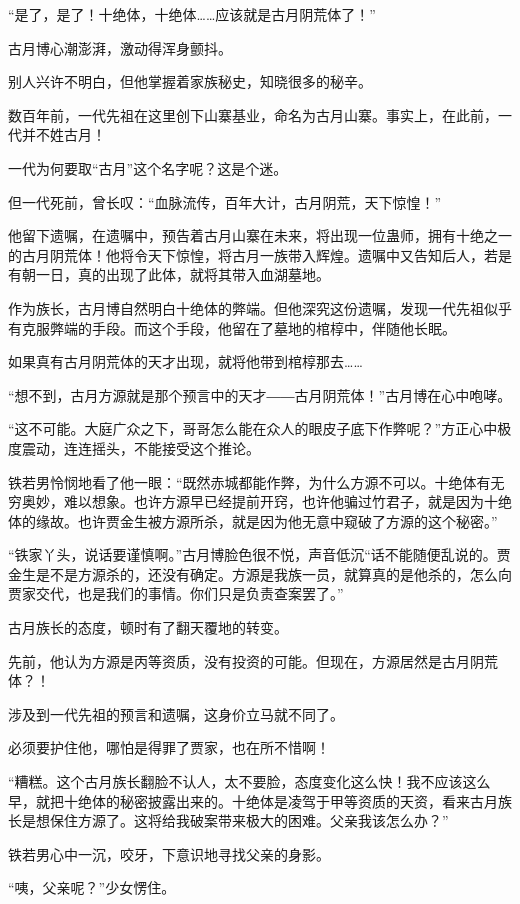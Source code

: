 \begin{this_body}
“是了，是了！十绝体，十绝体……应该就是古月阴荒体了！”

古月博心潮澎湃，激动得浑身颤抖。

别人兴许不明白，但他掌握着家族秘史，知晓很多的秘辛。

数百年前，一代先祖在这里创下山寨基业，命名为古月山寨。事实上，在此前，一代并不姓古月！

一代为何要取“古月”这个名字呢？这是个迷。

但一代死前，曾长叹：“血脉流传，百年大计，古月阴荒，天下惊惶！”

他留下遗嘱，在遗嘱中，预告着古月山寨在未来，将出现一位蛊师，拥有十绝之一的古月阴荒体！他将令天下惊惶，将古月一族带入辉煌。遗嘱中又告知后人，若是有朝一日，真的出现了此体，就将其带入血湖墓地。

作为族长，古月博自然明白十绝体的弊端。但他深究这份遗嘱，发现一代先祖似乎有克服弊端的手段。而这个手段，他留在了墓地的棺椁中，伴随他长眠。

如果真有古月阴荒体的天才出现，就将他带到棺椁那去……

“想不到，古月方源就是那个预言中的天才――古月阴荒体！”古月博在心中咆哮。

“这不可能。大庭广众之下，哥哥怎么能在众人的眼皮子底下作弊呢？”方正心中极度震动，连连摇头，不能接受这个推论。

铁若男怜悯地看了他一眼：“既然赤城都能作弊，为什么方源不可以。十绝体有无穷奥妙，难以想象。也许方源早已经提前开窍，也许他骗过竹君子，就是因为十绝体的缘故。也许贾金生被方源所杀，就是因为他无意中窥破了方源的这个秘密。”

“铁家丫头，说话要谨慎啊。”古月博脸色很不悦，声音低沉“话不能随便乱说的。贾金生是不是方源杀的，还没有确定。方源是我族一员，就算真的是他杀的，怎么向贾家交代，也是我们的事情。你们只是负责查案罢了。”

古月族长的态度，顿时有了翻天覆地的转变。

先前，他认为方源是丙等资质，没有投资的可能。但现在，方源居然是古月阴荒体？！

涉及到一代先祖的预言和遗嘱，这身价立马就不同了。

必须要护住他，哪怕是得罪了贾家，也在所不惜啊！

“糟糕。这个古月族长翻脸不认人，太不要脸，态度变化这么快！我不应该这么早，就把十绝体的秘密披露出来的。十绝体是凌驾于甲等资质的天资，看来古月族长是想保住方源了。这将给我破案带来极大的困难。父亲我该怎么办？”

铁若男心中一沉，咬牙，下意识地寻找父亲的身影。

“咦，父亲呢？”少女愣住。


\end{this_body}
